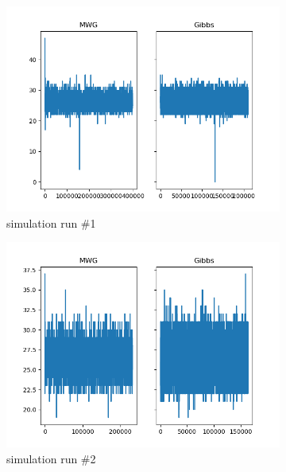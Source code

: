 \begin{figure}[H]
    \centering
    \begin{subfigure}{.3\textwidth}
    	\centering
        \includegraphics[width=\linewidth]{../../plots/Trace_M2_N50_NMCMC1_seed0_diffind2.png}
        \caption{simulation run \#1}
    \end{subfigure}
    \begin{subfigure}{.3\textwidth}
        \centering
    	\includegraphics[width=\linewidth]{../../plots/Trace_M2_N50_NMCMC1_seed1_diffind2.png}
    	\caption{simulation run \#2}
	\end{subfigure}
	\begin{subfigure}{.3\textwidth}
	    \centering

\end{subfigure}
\end{figure}
